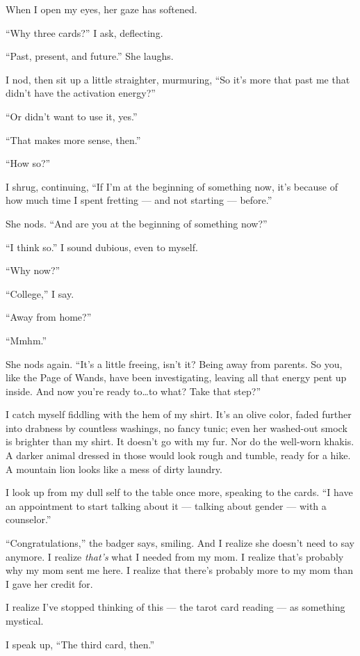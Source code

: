 When I open my eyes, her gaze has softened.

``Why three cards?'' I ask, deflecting.

``Past, present, and future.'' She laughs.

I nod, then sit up a little straighter, murmuring, ``So it's more that
past me that didn't have the activation energy?''

``Or didn't want to use it, yes.''

``That makes more sense, then.''

``How so?''

I shrug, continuing, ``If I'm at the beginning of something now, it's
because of how much time I spent fretting --- and not starting ---
before.''

She nods. ``And are you at the beginning of something now?''

``I think so.'' I sound dubious, even to myself.

``Why now?''

``College,'' I say.

``Away from home?''

``Mmhm.''

She nods again. ``It's a little freeing, isn't it? Being away from
parents. So you, like the Page of Wands, have been investigating,
leaving all that energy pent up inside. And now you're ready
to\ldots{}to what? Take that step?''

I catch myself fiddling with the hem of my shirt. It's an olive color,
faded further into drabness by countless washings, no fancy tunic; even
her washed-out smock is brighter than my shirt. It doesn't go with my
fur. Nor do the well-worn khakis. A darker animal dressed in those would
look rough and tumble, ready for a hike. A mountain lion looks like a
mess of dirty laundry.

I look up from my dull self to the table once more, speaking to the
cards. ``I have an appointment to start talking about it --- talking
about gender --- with a counselor.''

``Congratulations,'' the badger says, smiling. And I realize she doesn't
need to say anymore. I realize \emph{that's} what I needed from my mom.
I realize that's probably why my mom sent me here. I realize that
there's probably more to my mom than I gave her credit for.

I realize I've stopped thinking of this --- the tarot card reading ---
as something mystical.

I speak up, ``The third card, then.''

